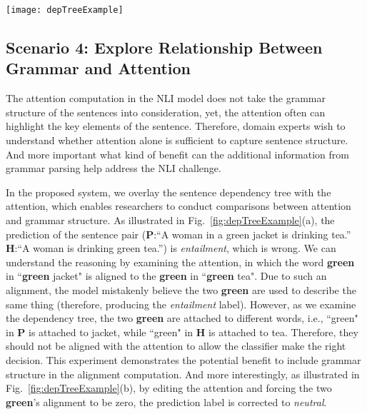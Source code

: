 %
\begin{figure*}[t]
\centering
\vspace{-2mm}
 \texttt{[image: depTreeExample]}
 \caption{
Dependency tree provides valuable information which can help fix the prediction error.
In (a), the model mistakenly aligns the word green, which lead to wrong prediction.  
After examining the dependency tree, we can see the two \textbf{green} are attached to different words.
In (b), by editing the attention and forcing the two \textbf{green}'s alignment to be zero, the prediction label is corrected to \emph{neutral}. 
 }
\label{fig:depTreeExample}
\end{figure*}

\subsection{Scenario 4: Explore Relationship Between Grammar and Attention}
The attention computation in the NLI model does not take the grammar structure of the sentences into consideration,
yet, the attention often can highlight the key elements of the sentence. 
Therefore, domain experts wish to understand whether attention alone is sufficient to capture sentence structure. 
And more important what kind of benefit can the additional information from grammar parsing help address the NLI challenge.

In the proposed system, we overlay the sentence dependency tree with the attention, which enables researchers to conduct comparisons between attention and grammar structure.
As illustrated in Fig.~\ref{fig:depTreeExample}(a), the prediction of the sentence pair (\textbf{P}:``A woman in a green jacket is drinking tea.'' \textbf{H}:``A woman is drinking green tea.'') is \emph{entailment}, which is wrong. We can understand the reasoning by examining the attention, in which the word \textbf{green} in ``\textbf{green} jacket" is aligned to the \textbf{green} in ``\textbf{green} tea". Due to such an alignment, the model mistakenly believe the two \textbf{green} are used to describe the same thing (therefore, producing the \emph{entailment} label).  However, as we examine the dependency tree, the two \textbf{green} are attached to different words, i.e., ``green" in \textbf{P} is attached to jacket, while ``green" in \textbf{H} is attached to tea. Therefore, they should not be aligned with the attention to allow the classifier make the right decision.
%
This experiment demonstrates the potential benefit to include grammar structure in the alignment computation. %
%
And more interestingly, as illustrated in Fig.~\ref{fig:depTreeExample}(b), by editing the attention and forcing the two \textbf{green}'s alignment to be zero, the prediction label is corrected to \emph{neutral}. 

